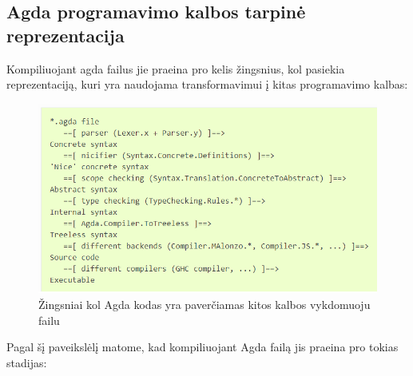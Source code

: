 \documentclass{VUMIFPSkursinis}
\begin{document}
\subsection{Agda programavimo kalbos tarpinė reprezentacija}
Kompiliuojant agda failus jie praeina pro kelis žingsnius, kol pasiekia reprezentaciją, kuri yra naudojama transformavimui į kitas programavimo kalbas:
\begin{figure}[H]
	\centering
	\includegraphics{agdaFileCompilation.png}
	\caption{Žingsniai kol Agda kodas yra paverčiamas kitos kalbos vykdomuoju failu \cite{AgdaWeb}}
	\centering
	\end{figure}
Pagal šį paveikslėlį matome, kad kompiliuojant Agda failą jis praeina pro tokias stadijas: 
\end{document}
